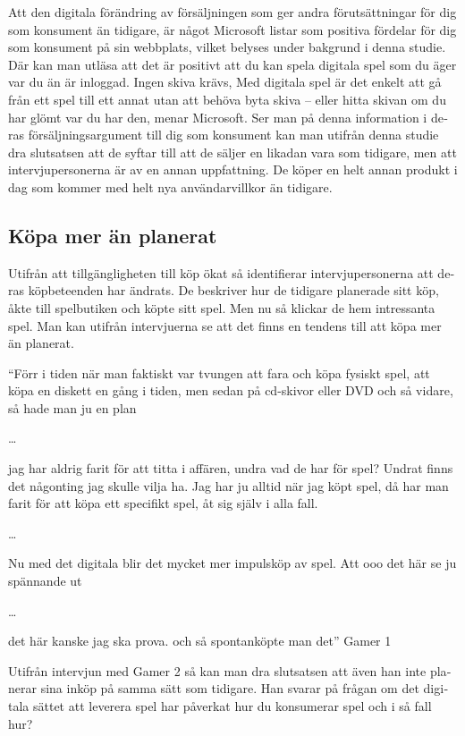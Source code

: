 \documentclass[11p]{article}
\begin{document}
\begin{otherlanguage}{swedish}
    \setlength{\leftskip}{0cm}
    Att den digitala förändring av försäljningen som ger andra förutsättningar för dig som konsument än tidigare, är något Microsoft listar som positiva fördelar för dig som konsument på sin webbplats, vilket belyses under bakgrund i denna studie. Där kan man utläsa att det är positivt att du kan spela digitala spel som du äger var du än är inloggad. Ingen skiva krävs,  Med digitala spel är det enkelt att gå från ett spel till ett annat utan att behöva byta skiva – eller hitta skivan om du har glömt var du har den, menar Microsoft.
    Ser man på  denna information i deras försäljningsargument till dig som konsument kan man utifrån denna studie dra slutsatsen att de syftar till att de säljer en likadan vara som tidigare, men att intervjupersonerna är av en annan uppfattning. De köper en helt annan produkt i dag som kommer med helt nya användarvillkor än tidigare.

    \subsection{Köpa mer än planerat}

    Utifrån att tillgängligheten till köp ökat så identifierar intervjupersonerna  att deras köpbeteenden har ändrats. De beskriver hur de tidigare planerade sitt köp, åkte till spelbutiken och köpte sitt spel. Men nu så klickar de hem intressanta spel. Man kan utifrån intervjuerna se att det finns en tendens till att köpa mer än planerat.

    \setlength{\leftskip}{1cm}

    “Förr i tiden när man faktiskt var tvungen att fara och köpa fysiskt spel, att köpa en diskett en gång i tiden, men sedan på cd-skivor eller DVD och så vidare, så hade man ju en plan

    \dots

    jag har aldrig farit för att titta i affären, undra vad de har för spel? Undrat finns det någonting jag skulle vilja ha. Jag har ju alltid när jag köpt spel, då har man farit för att köpa ett specifikt spel, åt sig själv i alla fall.

    \dots

    Nu med det digitala blir det mycket mer impulsköp av spel. Att ooo det här se ju spännande ut

    \dots

    det här kanske jag ska prova. och så spontanköpte man det”  Gamer 1

    \setlength{\leftskip}{0cm}
    Utifrån intervjun med Gamer 2 så kan man dra slutsatsen att även han inte planerar sina inköp på samma sätt som tidigare. Han svarar på frågan om det digitala sättet att leverera spel har påverkat hur du konsumerar spel och i så fall hur?


\end{otherlanguage}
\end{document}
